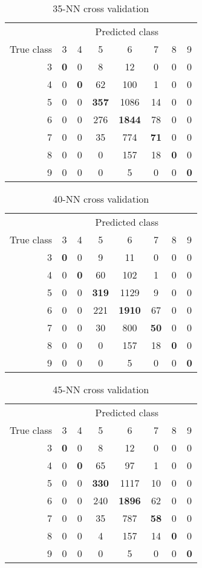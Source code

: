 \documentclass{report}
\begin{document}
\begin{table}
\centering
\begin{tabular}{r | *{7}{c}}
& \multicolumn{7}{c}{Predicted class} \\
True class & 3&4&5&6&7&8&9 \\
\hline
3 & \textbf{0}&0&8&12&0&0&0 \\
4 & 0&\textbf{0}&62&100&1&0&0 \\
5 & 0&0&\textbf{357}&1086&14&0&0 \\
6 & 0&0&276&\textbf{1844}&78&0&0 \\
7 & 0&0&35&774&\textbf{71}&0&0 \\
8 & 0&0&0&157&18&\textbf{0}&0 \\
9 & 0&0&0&5&0&0&\textbf{0} \\
\end{tabular}
\caption{35-NN cross validation}
\end{table}
\begin{table}
\centering
\begin{tabular}{r | *{7}{c}}
& \multicolumn{7}{c}{Predicted class} \\
True class & 3&4&5&6&7&8&9 \\
\hline
3 & \textbf{0}&0&9&11&0&0&0 \\
4 & 0&\textbf{0}&60&102&1&0&0 \\
5 & 0&0&\textbf{319}&1129&9&0&0 \\
6 & 0&0&221&\textbf{1910}&67&0&0 \\
7 & 0&0&30&800&\textbf{50}&0&0 \\
8 & 0&0&0&157&18&\textbf{0}&0 \\
9 & 0&0&0&5&0&0&\textbf{0} \\
\end{tabular}
\caption{40-NN cross validation}
\end{table}
\begin{table}
\centering
\begin{tabular}{r | *{7}{c}}
& \multicolumn{7}{c}{Predicted class} \\
True class & 3&4&5&6&7&8&9 \\
\hline
3 & \textbf{0}&0&8&12&0&0&0 \\
4 & 0&\textbf{0}&65&97&1&0&0 \\
5 & 0&0&\textbf{330}&1117&10&0&0 \\
6 & 0&0&240&\textbf{1896}&62&0&0 \\
7 & 0&0&35&787&\textbf{58}&0&0 \\
8 & 0&0&4&157&14&\textbf{0}&0 \\
9 & 0&0&0&5&0&0&\textbf{0} \\
\end{tabular}
\caption{45-NN cross validation}
\end{table}
\end{document}
